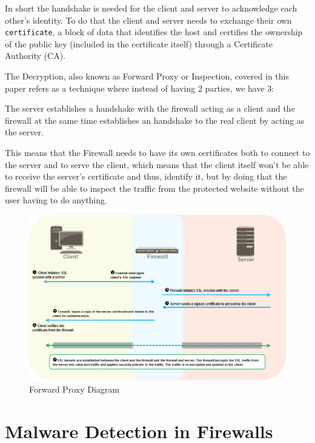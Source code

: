 In short the handshake is needed for the client and server to acknowledge each other's identity. To do that the client and server needs to exchange their own \verb|certificate|, a block of data that identifies the host and certifies the ownership of the public key (included in the certificate itself) through a Certificate Authority (CA).

The  Decryption, also known as  Forward Proxy or  Inspection, covered in this paper refers as a technique where instead of having  2 parties, we have 3:

The server establishes a handshake with the firewall acting as a client and the firewall at the same time establishes an handshake to the real client by acting as the server.

This means that the Firewall needs to have its own certificates both to connect to the server and to serve the client, which means that the client itself won't be able to receive the server's certificate and thus, identify it, but by doing that the firewall will be able to inspect the traffic from the  protected website without the user having to do anything.

\begin{figure}[!hb]
 \centering
 \includegraphics[width=13cm]{img/ssl_decryption_diagram.png}
 \caption{ Forward Proxy Diagram\cite{ibm-handshake}}
 \label{SSL Forward Diagram}
\end{figure}

\newpage

\section{Malware Detection in Firewalls}


